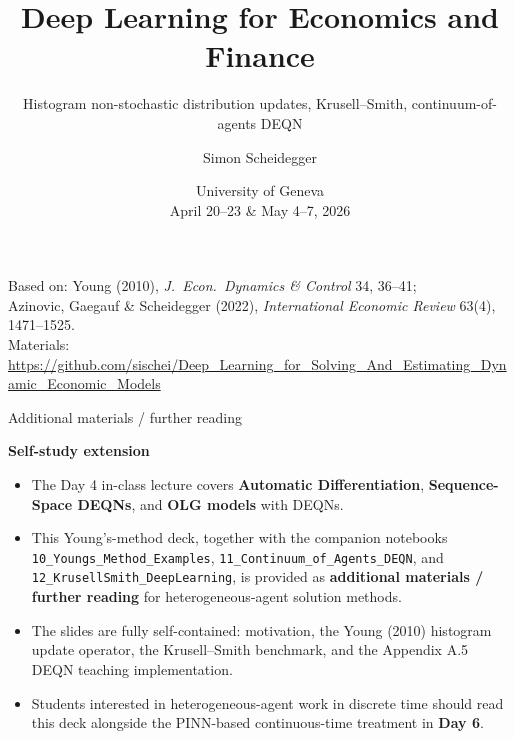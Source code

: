 \documentclass[aspectratio=169,11pt]{beamer}
\title[Deep Learning -- Geneva 2026]%
{Deep Learning for Economics and Finance}
\subtitle{Histogram non-stochastic distribution updates, Krusell--Smith, continuum-of-agents DEQN}
\author{Simon Scheidegger}
\institute[HEC Lausanne]{HEC, University of Lausanne}
\date{University of Geneva\\April 20--23 \& May 4--7, 2026}
\begin{document}
\newcommand{\exercisepause}{%
  \tikz[baseline=(X.base)]{\node[fill=darkgreen!80!black, text=white,
  rounded corners=2pt, inner sep=3pt, font=\scriptsize\bfseries](X){PAUSE --- 5 min};}}



{
\begin{frame}
\titlepage
\vspace{-0.4cm}
\begin{center}
{\footnotesize Based on: Young (2010), \emph{J.\ Econ.\ Dynamics \& Control} 34, 36--41;\\
Azinovic, Gaegauf \& Scheidegger (2022), \emph{International Economic Review} 63(4), 1471--1525.}\\[4pt]
{\footnotesize Materials: \url{https://github.com/sischei/Deep_Learning_for_Solving_And_Estimating_Dynamic_Economic_Models}}
\end{center}
\end{frame}
}

{
\begin{frame}{\textcolor{uzhblue}{Additional materials / further reading}}
\vspace{0.2cm}
\begin{center}
{\LARGE\bfseries\color{uzhblue} Self-study extension}
\end{center}
\vspace{0.4cm}
\begin{itemize}\setlength\itemsep{0.3em}
    \item The Day 4 in-class lecture covers \textbf{Automatic Differentiation}, \textbf{Sequence-Space DEQNs}, and \textbf{OLG models} with DEQNs.
    \item This Young's-method deck, together with the companion notebooks \texttt{10\_Youngs\_Method\_Examples}, \texttt{11\_Continuum\_of\_Agents\_DEQN}, and \texttt{12\_KrusellSmith\_DeepLearning}, is provided as \textbf{additional materials / further reading} for heterogeneous-agent solution methods.
    \item The slides are fully self-contained: motivation, the Young (2010) histogram update operator, the Krusell--Smith benchmark, and the Appendix A.5 DEQN teaching implementation.
    \item Students interested in heterogeneous-agent work in discrete time should read this deck alongside the PINN-based continuous-time treatment in \textbf{Day 6}.
\end{itemize}
\end{frame}
}
\end{document}
